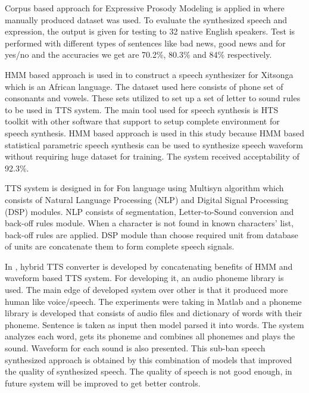 Corpus based approach for Expressive Prosody Modeling is applied in \cite{eide2004corpus} where manually produced dataset was used. To evaluate the synthesized
speech and expression, the output is given for testing to 32 native English speakers. Test is performed with different types of sentences like bad news, good news and for yes/no and the accuracies we get are 70.2\%, 80.3\% and 84\% respectively.


HMM based approach is used in \cite{baloyi2012text} to construct a speech synthesizer for Xitsonga which is an African language. The dataset used here consists of phone set of consonants and vowels. These sets utilized to set up a set of letter to sound rules to be used in TTS system. The main tool used for speech synthesis is HTS toolkit \cite{hts_2.2} with other software that support to setup complete environment for speech synthesis. HMM based approach is used in this study because HMM based statistical parametric speech synthesis can be used to synthesize speech waveform without requiring huge dataset for training. The system received acceptability of 92.3\%. 

TTS system is designed in \cite{dagba2014text} for Fon language using Multisyn algorithm \cite{clark2007multisyn} which consists of Natural Language Processing (NLP) and Digital Signal Processing (DSP) modules. NLP consists of segmentation, Letter-to-Sound conversion and back-off rules module. When a character is not found in known characters' list, back-off rules are applied. DSP module than choose required unit from database of units are concatenate them to form complete speech signals.

In \cite{ganai2016text}, hybrid TTS converter is developed by concatenating benefits of HMM and waveform based TTS system. For developing it, an audio phoneme library is used. The main edge of developed system over other is that it produced more human like voice/speech. The experiments were taking in Matlab and a phoneme library is developed that consists of audio files and dictionary of words with their phoneme. Sentence is taken as input then model parsed it into words. The system analyzes each word, gets its phoneme and combines all phonemes and plays the sound. Waveform for each sound is also presented. This sub-ban speech synthesized approach is obtained by this combination of models that improved the quality of synthesized speech. The quality of speech is not good enough, in future system will be improved to get better controls.

